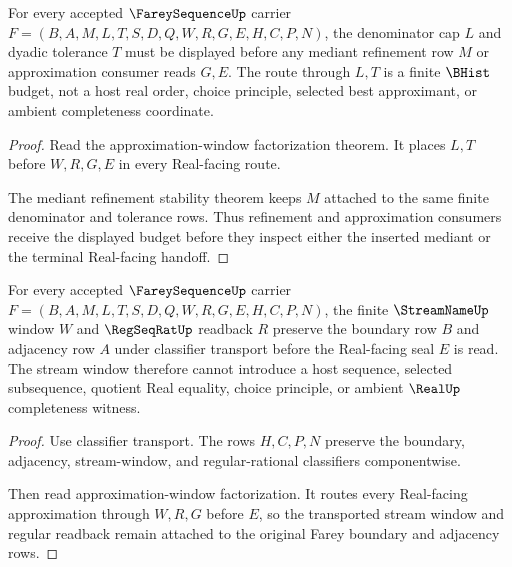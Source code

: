 \begin{theorem}
\label{thm:farey-sequence-denominator-bound-window}
For every accepted $\FareySequenceUp$ carrier $F=(B,A,M,L,T,S,D,Q,W,R,G,E,H,C,P,N)$, the denominator cap $L$ and dyadic tolerance $T$ must be displayed before any mediant refinement row $M$ or approximation consumer reads $G,E$. The route through $L,T$ is a finite $\BHist$ budget, not a host real order, choice principle, selected best approximant, or ambient completeness coordinate.
\end{theorem}
\begin{proof}
Read the approximation-window factorization theorem. It places $L,T$ before $W,R,G,E$ in every Real-facing route.

The mediant refinement stability theorem keeps $M$ attached to the same finite denominator and tolerance rows. Thus refinement and approximation consumers receive the displayed budget before they inspect either the inserted mediant or the terminal Real-facing handoff.
\end{proof}

\begin{theorem}
\label{thm:farey-sequence-stream-window-stability}
For every accepted $\FareySequenceUp$ carrier $F=(B,A,M,L,T,S,D,Q,W,R,G,E,H,C,P,N)$, the finite $\StreamNameUp$ window $W$ and $\RegSeqRatUp$ readback $R$ preserve the boundary row $B$ and adjacency row $A$ under classifier transport before the Real-facing seal $E$ is read. The stream window therefore cannot introduce a host sequence, selected subsequence, quotient Real equality, choice principle, or ambient $\RealUp$ completeness witness.
\end{theorem}
\begin{proof}
Use classifier transport. The rows $H,C,P,N$ preserve the boundary, adjacency, stream-window, and regular-rational classifiers componentwise.

Then read approximation-window factorization. It routes every Real-facing approximation through $W,R,G$ before $E$, so the transported stream window and regular readback remain attached to the original Farey boundary and adjacency rows.
\end{proof}

